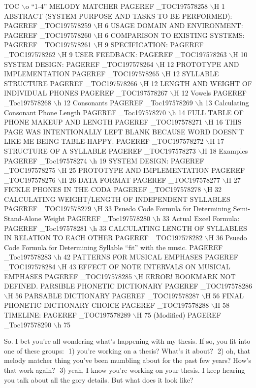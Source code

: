 \documentclass[10pt,oneside]{memoir}
\begin{document}
\pagebreak TOC $\backslash$o ``1-4'' 
MELODY MATCHER   PAGEREF \_TOC197578258 $\backslash$H 1
ABSTRACT (SYSTEM PURPOSE AND TASKS TO BE PERFORMED):     PAGEREF \_TOC197578259 $\backslash$H 6
USAGE DOMAIN AND ENVIRONMENT:    PAGEREF \_TOC197578260 $\backslash$H 6
COMPARISON TO EXISTING SYSTEMS:  PAGEREF \_TOC197578261 $\backslash$H 9
SPECIFICATION:   PAGEREF \_TOC197578262 $\backslash$H 9
USER FEEDBACK:   PAGEREF \_TOC197578263 $\backslash$H 10
SYSTEM DESIGN:   PAGEREF \_TOC197578264 $\backslash$H 12
PROTOTYPE AND IMPLEMENTATION     PAGEREF \_TOC197578265 $\backslash$H 12
SYLLABLE STRUCTURE   PAGEREF \_TOC197578266 $\backslash$H 12
LENGTH AND WEIGHT OF INDIVIDUAL PHONES   PAGEREF \_TOC197578267 $\backslash$H 12
Vowels   PAGEREF \_Toc197578268 $\backslash$h 12
Consonants   PAGEREF \_Toc197578269 $\backslash$h 13
Calculating Consonant Phone Length   PAGEREF \_Toc197578270 $\backslash$h 14
FULL TABLE OF PHONE MAKEUP AND LENGTH    PAGEREF \_TOC197578271 $\backslash$H 16
THIS PAGE WAS INTENTIONALLY LEFT BLANK BECAUSE WORD DOESN'T LIKE ME BEING TABLE-HAPPY.     PAGEREF \_TOC197578272 $\backslash$H 17
STRUCTURE OF A SYLLABLE  PAGEREF \_TOC197578273 $\backslash$H 18
Examples     PAGEREF \_Toc197578274 $\backslash$h 19
SYSTEM DESIGN:   PAGEREF \_TOC197578275 $\backslash$H 25
PROTOTYPE AND IMPLEMENTATION     PAGEREF \_TOC197578276 $\backslash$H 26
DATA FORMAT  PAGEREF \_TOC197578277 $\backslash$H 27
FICKLE PHONES IN THE CODA    PAGEREF \_TOC197578278 $\backslash$H 32
CALCULATING WEIGHT/LENGTH OF INDEPENDENT SYLLABLES   PAGEREF \_TOC197578279 $\backslash$H 33
Psuedo Code Formula for Determining Semi-Stand-Alone Weight  PAGEREF \_Toc197578280 $\backslash$h 33
Actual Excel Formula:    PAGEREF \_Toc197578281 $\backslash$h 33
CALCULATING LENGTH OF SYLLABLES IN RELATION TO EACH OTHER    PAGEREF \_TOC197578282 $\backslash$H 36
Psuedo Code Formula for Determining Syllable ``fit'' with the music.   PAGEREF \_Toc197578283 $\backslash$h 42
PATTERNS FOR MUSICAL EMPHASES    PAGEREF \_TOC197578284 $\backslash$H 43
EFFECT OF NOTE INTERVALS ON MUSICAL EMPHASES     PAGEREF \_TOC197578285 $\backslash$H ERROR! BOOKMARK NOT DEFINED.
PARSIBLE PHONETIC DICTIONARY     PAGEREF \_TOC197578286 $\backslash$H 56
PARSABLE DICTIONARY  PAGEREF \_TOC197578287 $\backslash$H 56
FINAL PHONETIC DICTIONARY CHOICE     PAGEREF \_TOC197578288 $\backslash$H 58
TIMELINE:    PAGEREF \_TOC197578289 $\backslash$H 75
(Modified)   PAGEREF \_Toc197578290 $\backslash$h 75


\pagebreak So. I bet you're all wondering what's happening with my thesis. If so, you fit into one of these groups:  1) you're working on a thesis? What's it about?  2) oh, that melody matcher thing you've been mumbling about for the past few years? How's that work again?  3) yeah, I know you're working on your thesis. I keep hearing you talk about all the gory details. But what does it look like?
\end{document}
